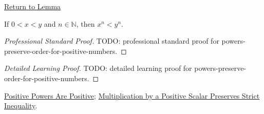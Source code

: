 \newpage
{}
\label{prf:powers-preserve-order-for-positive-numbers}

\begin{remark*}[Return]
\hyperref[lem:powers-preserve-order-for-positive-numbers]{Return to Lemma}
\end{remark*}

\begin{lemma*}
If $0<x<y$ and $n\in\mathbb{N}$, then $x^n<y^n$.
\end{lemma*}

\begin{proof}[Professional Standard Proof]
\LRAProofBodyStart
TODO: professional standard proof for powers-preserve-order-for-positive-numbers.
\end{proof}

\begin{proof}[Detailed Learning Proof]
\LRAProofBodyStart
TODO: detailed learning proof for powers-preserve-order-for-positive-numbers.
\end{proof}

\begin{remark*}
\end{remark*}

\begin{dependencies}
\hyperref[lem:positive-powers-are-positive]{Positive Powers Are Positive};
\hyperref[thm:ineq-multiply-positive]{Multiplication by a Positive Scalar Preserves Strict Inequality}.
\end{dependencies}

\clearpage
